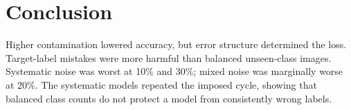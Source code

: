 \section{Conclusion}

Higher contamination lowered accuracy, but error structure determined the
loss. Target-label mistakes were more harmful than balanced unseen-class
images. Systematic noise was worst at 10\% and 30\%; mixed noise was marginally
worse at 20\%. The systematic models repeated the imposed cycle, showing that
balanced class counts do not protect a model from consistently wrong labels.
